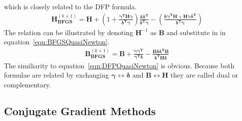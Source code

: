 which is closely related to the \ac{DFP} formula.
%
\begin{align}
    \mathbf{H}_\mathbf{BFGS}^{(k+1)}=\mathbf{H}
    +\left(1+\frac{\bm{\gamma}^\mathbf{T}\mathbf{H}\bm{\gamma}}{\bm{\delta}^\mathbf{T}\bm{\gamma}}\right)
    \frac{\bm{\delta\delta}^\mathbf{T}}{\bm{\delta}^\mathbf{T}\bm{\gamma}}
    -\left(\frac{\bm{\delta\gamma}^\mathbf{T}\mathbf{H}+\mathbf{H}\bm{\gamma\delta}^\mathbf{T}}{\bm{\delta}^\mathbf{T}\bm{\gamma}}\right)\label{eqn:BFGSQuasiNewton}
\end{align}
%
The relation can be illustrated by denoting $\mathbf{H}^{-1}$ as $\mathbf{B}$
and substitute in in equation~\eqref{eqn:BFGSQuasiNewton}.
%
\begin{align}
    \mathbf{B}_\mathbf{BFGS}^{(k+1)}=\mathbf{B}+\frac{\bm{\gamma\gamma}^\mathbf{T}}{\bm{\gamma}^\mathbf{T}\bm{\delta}}
    -\frac{\mathbf{B}\bm{\delta\delta}^\mathbf{T}\mathbf{B}}{\bm{\delta}^\mathbf{T}\mathbf{H}\bm{\delta}}
\end{align}
%
The similiarity to equation~\eqref{eqn:DFPQuasiNewton} is obvious. Because both
formulae are related by exchanging $\bm{\gamma}\leftrightarrow\bm{\delta}$ and
$\mathbf{B}\leftrightarrow\mathbf{H}$ they are called dual or complementary.

\subsection{Conjugate Gradient Methods}
\label{sec:ConjugateGradientMethods}

